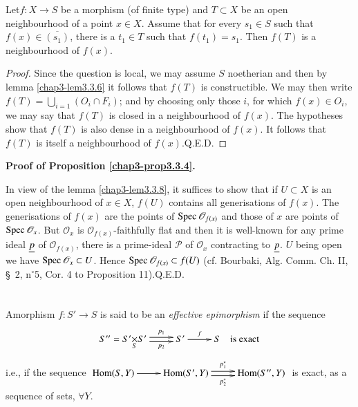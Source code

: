 \begin{lemma}\label{chap3-lem3.3.8}
Let\pageoriginale $f:X\to S$ be a morphism (of finite type) and
$T\subset X$ be an open neighbourhood of a point $x\in X$. Assume that
for every $s_{1}\in S$ such that $f(x)\in \overline{(s_{1})}$, there
is a $t_{1}\in T$ such that $f(t_{1})=s_{1}$. Then $f(T)$ is a
neighbourhood of $f(x)$. 
\end{lemma}


\begin{proof}
Since the question is local, we may assume $S$ noetherian and then by
lemma \ref{chap3-lem3.3.6} it follows that $f(T)$ is constructible. We may
then write $f(T)=\bigcup\limits_{i=1}(O_{i}\cap F_{i})$; and by
choosing only those $i$, for which $f(x)\in O_{i}$, we may say that
$f(T)$ is closed in a neighbourhood of $f(x)$. The hypotheses show
that $f(T)$ is also dense in a neighbourhood of $f(x)$. It follows
that $f(T)$ is itself a neighbourhood of $f(x)$.\hfill Q.E.D.
\end{proof}

\medskip
\noindent
{\bf Proof of Proposition \ref{chap3-prop3.3.4}.}
\smallskip

In view of the lemma \ref{chap3-lem3.3.8}, it suffices to show that if
$U\subset X$ is an open neighbourhood of $x\in X$, $f(U)$ contains all
generisations of $f(x)$. The generisations of $f(x)$ are the points of
$\operatorname{Spec} \mathscr{O}_{f(x)}$ and those of $x$ are points of $\operatorname{Spec}
\mathscr{O}_{x}$. But $\mathscr{O}_{x}$ is
$\mathscr{O}_{f(x)}$-faithfully flat and then it is well-known for any
prime ideal $\underline{p}$ of $\mathscr{O}_{f(x)}$, there is a prime-ideal
$\mathscr{P}$ of $\mathscr{O}_{x}$ contracting to $\underline{p}$. $U$ being
open we have $\operatorname{Spec} \mathscr{O}_{x}\subset U$. Hence $\operatorname{Spec}
\mathscr{O}_{f(x)}\subset f(U)$ (cf. Bourbaki, Alg. Comm. Ch. II,
\S\ 2, n$^\circ$5, Cor. 4 to Proposition 11).\hfill Q.E.D.


\section{}\label{chap3-sec3.4}

A\pageoriginale morphism $f:S'\to S$ is said to be an {\em effective
  epimorphism} if the sequence
\[
\xymatrix{
S''=\fprod{S'}{S'}{S} \ar@<.5ex>[r]^-{p_{1}} \ar@<-.5ex>[r]_-{p_{2}} &
S'\ar[r]^-{f} & S\text{\quad is exact}
}
\]
i.e., if the sequence $\xymatrix{
\Hom (S,Y)\ar[r] & \Hom(S',Y) \ar@<.5ex>[r]^-{p_{1}^{\ast}}
\ar@<-.5ex>[r]_-{p_{2}^{\ast}} & \Hom(S'',Y)}$ is exact, as a sequence
of sets, $\forall Y$.

